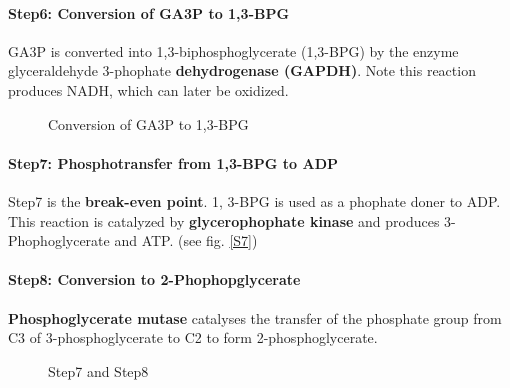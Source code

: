 \documentclass[../main.tex]{subfiles}
\begin{document}
\paragraph{Step6: Conversion of GA3P to 1,3-BPG}
GA3P is converted into 1,3-biphosphoglycerate (1,3-BPG) by the enzyme glyceraldehyde 3-phophate \textbf{dehydrogenase (GAPDH)}. Note this reaction produces NADH, which can later be oxidized.  
\begin{figure}[H]
	\centering
	\caption{Conversion of GA3P to 1,3-BPG}
\end{figure}

\paragraph{Step7: Phosphotransfer from 1,3-BPG to ADP}
Step7 is the \textbf{break-even point}. 1, 3-BPG is used as a phophate doner to ADP. This reaction is catalyzed by \textbf{glycerophophate kinase} and produces 3-Phophoglycerate and ATP. (see fig. \ref{S7})

\paragraph{Step8: Conversion to 2-Phophopglycerate}
\textbf{Phosphoglycerate mutase} catalyses the transfer of the phosphate group from C3 of 3-phosphoglycerate to C2 to form 2-phosphoglycerate. 

\begin{figure}[h!]
	\centering
	\caption{Step7 and Step8}
\end{figure}
\end{document}
